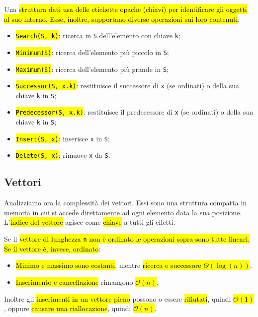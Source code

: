 \documentclass[a4paper,11pt,twoside]{article}
\theoremstyle{plain}
\theoremstyle{definition}
\theoremstyle{remark}
\begin{document}
Una \hl{struttura dati usa delle etichette opache (chiavi) per identificare gli
oggetti al suo interno. Esse, inoltre, supportano diverse operazioni sui loro
contenuti}:

\begin{itemize}
  \item \hl{\texttt{Search(S, k)}}: ricerca in \texttt{S} dell'elemento con chiave
    \texttt{k};
  \item \hl{\texttt{Minimum(S)}}: ricerca dell'elemento più piccolo in \texttt{S};
  \item \hl{\texttt{Maximum(S)}}: ricerca dell'elemento più grande in \texttt{S};
  \item \hl{\texttt{Successor(S, x.k)}}: restituisce il successore di \texttt{x} (se
    ordinati) o della sua chiave \texttt{k} in \texttt{S};
  \item \hl{\texttt{Predecessor(S, x.k)}}: restituisce il predecessore di \texttt{x}
    (se ordinati) o della sua chiave \texttt{k} in \texttt{S};
  \item \hl{\texttt{Insert(S, x)}}: inserisce \texttt{x} in \texttt{S};
  \item \hl{\texttt{Delete(S, x)}}: rimuove \texttt{x} da \texttt{S}.
\end{itemize}

\subsection{Vettori}\label{sec:array}

Analizziamo ora la complessità dei vettori. Essi sono una struttura compatta in
memoria in cui si accede direttamente ad ogni elemento data la sua posizione.
L'\hl{indice del vettore} agisce come \hl{chiave} a tutti gli effetti.

Se il \hl{vettore di lunghezza \texttt{n} non è ordinato le operazioni sopra
sono tutte lineari. Se il vettore è, invece, ordinato}:

\begin{itemize}
  \item \hl{Minimo e massimo sono costanti}, mentre \hl{ricerca e successore
    $\Theta(\log(n))$}.
  \item \hl{Inserimento e cancellazione} rimangono \hl{$\mathcal{O}(n)$}.
\end{itemize}

Inoltre gli \hl{inserimenti in un vettore pieno} possono o essere
\hl{rifiutati}, quindi \hl{$\Theta(1)$}, oppure \hl{causare una riallocazione},
quindi \hl{$\mathcal{O}(n)$}.
\end{document}
